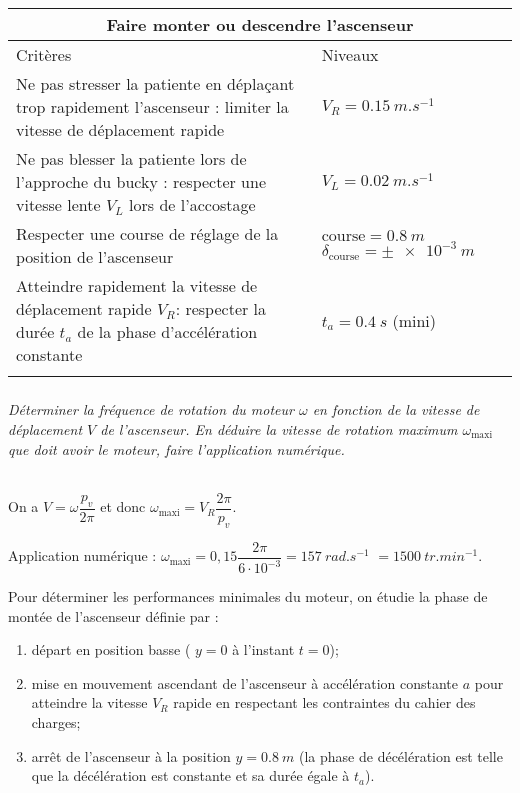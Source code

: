 \begin{multicols}{2}
\begin{center}
\begin{tabular}{|p{.6\linewidth}|p{.3\linewidth}|}
\hline
\multicolumn{2}{|c|}{Faire monter ou descendre l'ascenseur} \\
\hline
Critères & Niveaux \\
\hline
Ne pas stresser la patiente en déplaçant trop rapidement l’ascenseur : limiter la vitesse de
déplacement rapide & $V_R=\SI{0,15}{m.s^{-1}}$ \\ \hline
Ne pas blesser la patiente lors de l’approche du bucky : respecter une vitesse lente $V_L$ lors de
l’accostage & $V_L=\SI{0,02}{m.s^{-1}}$ \\ \hline 
Respecter une course de réglage de la position de l’ascenseur & $\text{course} = \SI{0,8}{m}$  $\delta_{\text{course}}=\pm\SI{e-3}{m}$ \\ \hline
Atteindre rapidement la vitesse de déplacement rapide $V_R$: respecter
la durée $t_a$ de la phase d’accélération constante & $t_a=\SI{0,4}{s}$ (mini) \\
 \\ \hline
\end{tabular}
\end{center}


\begin{center}
\end{center}

\subparagraph{}\textit{Déterminer la fréquence de rotation du moteur $\omega$ en fonction de la vitesse de
déplacement $V$ de l’ascenseur. %
En déduire la vitesse de rotation maximum $\omega_{\text{maxi}}$ que doit avoir le moteur, faire l’application numérique.}
\ifprof
\begin{corrige}~\\
On a $V=\omega \dfrac{p_v}{2\pi}$ et donc $\omega_{\text{maxi}} = V_R\dfrac{2\pi}{p_v}$.

Application numérique : $\omega_{\text{maxi}} = 0,15\dfrac{2\pi}{6\cdot 10^{-3}}=\SI{157}{rad.s^{-1}}$ $=\SI{1500}{tr.min^{-1}}$.
\end{corrige}
\else
\fi

Pour déterminer les performances minimales du moteur, on étudie la phase de montée de l’ascenseur définie par :
\begin{enumerate}
\item départ en position basse ( $y=0$ à l’instant $t=0$);
\item mise en mouvement ascendant de l’ascenseur à accélération constante $a$ pour atteindre la vitesse $V_R$ rapide en respectant les contraintes du cahier des charges;
\item arrêt de l’ascenseur à la position $y=\SI{0,8}{m}$ (la phase de décélération est telle que la décélération est constante et sa durée égale à $t_a$).
\end{enumerate}


\end{multicols}
